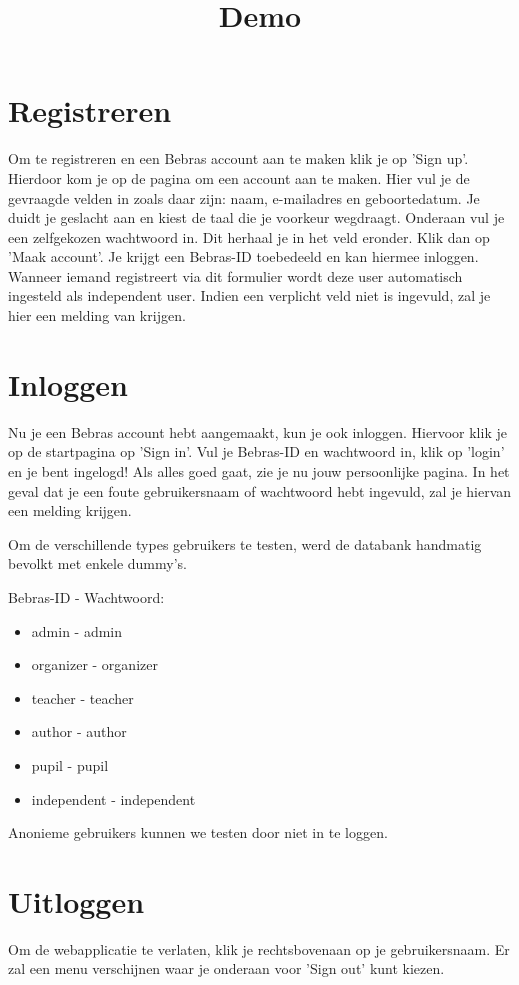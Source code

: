 \documentclass[]{article}
\title{
    Demo
}
\begin{document}
\maketitle

\section{Registreren}
Om te registreren en een Bebras account aan te maken klik je op 'Sign up'. Hierdoor kom je op de pagina om een account aan te maken. Hier vul je de gevraagde velden in zoals daar zijn: naam, e-mailadres en geboortedatum. Je duidt je geslacht aan en kiest de taal die je voorkeur wegdraagt. Onderaan vul je een zelfgekozen wachtwoord in. Dit herhaal je in het veld eronder. Klik dan op 'Maak account'. Je krijgt een Bebras-ID toebedeeld en kan hiermee inloggen.
Wanneer iemand registreert via dit formulier wordt deze user automatisch ingesteld als independent user.
Indien een verplicht veld niet is ingevuld, zal je hier een melding van krijgen. 

\section{Inloggen}
Nu je een Bebras account hebt aangemaakt, kun je ook inloggen. Hiervoor klik je op de startpagina op 'Sign in'. Vul je Bebras-ID en wachtwoord in, klik op 'login' en je bent ingelogd! Als alles goed gaat, zie je nu jouw persoonlijke pagina. In het geval dat je een foute gebruikersnaam of wachtwoord hebt ingevuld, zal je hiervan een melding krijgen.

Om de verschillende types gebruikers te testen, werd de databank handmatig bevolkt met enkele dummy's.

Bebras-ID - Wachtwoord:
\begin{itemize}
\item admin - admin
\item organizer - organizer
\item teacher - teacher
\item author - author
\item pupil - pupil
\item independent - independent
\end{itemize}

Anonieme gebruikers kunnen we testen door niet in te loggen.

\section{Uitloggen}
Om de webapplicatie te verlaten, klik je rechtsbovenaan op je gebruikersnaam. Er zal een menu verschijnen waar je onderaan voor 'Sign out' kunt kiezen.
\end{document}
